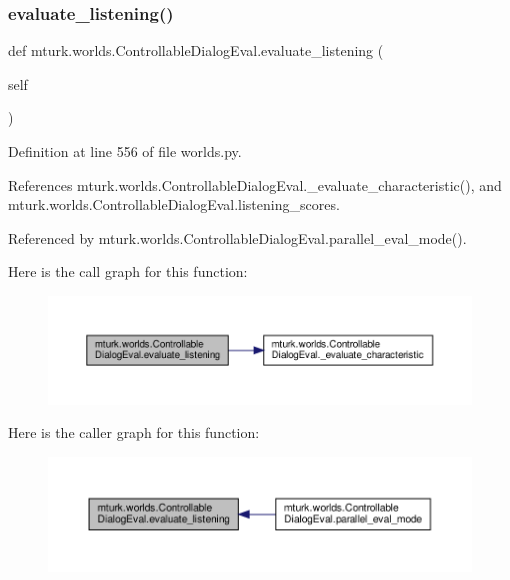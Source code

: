 \subsubsection{\texorpdfstring{evaluate\+\_\+listening()}{evaluate\_listening()}}
{\footnotesize\ttfamily def mturk.\+worlds.\+Controllable\+Dialog\+Eval.\+evaluate\+\_\+listening (\begin{DoxyParamCaption}\item[{}]{self }\end{DoxyParamCaption})}



Definition at line 556 of file worlds.\+py.



References mturk.\+worlds.\+Controllable\+Dialog\+Eval.\+\_\+evaluate\+\_\+characteristic(), and mturk.\+worlds.\+Controllable\+Dialog\+Eval.\+listening\+\_\+scores.



Referenced by mturk.\+worlds.\+Controllable\+Dialog\+Eval.\+parallel\+\_\+eval\+\_\+mode().

Here is the call graph for this function\+:
\nopagebreak
\begin{figure}[H]
\begin{center}
\leavevmode
\includegraphics[width=350pt]{classmturk_1_1worlds_1_1ControllableDialogEval_a7002b931f1813d4757dc00e67293aa90_cgraph}
\end{center}
\end{figure}
Here is the caller graph for this function\+:
\nopagebreak
\begin{figure}[H]
\begin{center}
\leavevmode
\includegraphics[width=350pt]{classmturk_1_1worlds_1_1ControllableDialogEval_a7002b931f1813d4757dc00e67293aa90_icgraph}
\end{center}
\end{figure}
\mbox{\label{classmturk_1_1worlds_1_1ControllableDialogEval_aced8844b17899e1cc4c920a72cb490a4}} 
